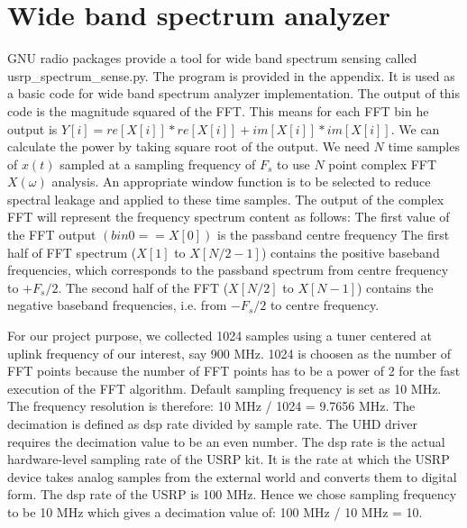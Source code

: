 \section{Wide band spectrum analyzer}

GNU radio packages provide a tool for
wide band spectrum sensing 
called 
usrp\_spectrum\_sense.py. The program is provided in the appendix. 
It is used as
a basic code for wide band spectrum analyzer implementation. The output of this 
code is the magnitude squared of the FFT. This means for each FFT bin he output 
is $ Y[i] = re[X[i]]*re[X[i]] + im[X[i]]*im[X[i]]$. We can calculate the power by
taking square root of the output. We need $N$ time samples of $x(t)$ sampled at a 
sampling frequency of $F_{s}$ to use $N$ point complex FFT $X(\omega)$ analysis. An 
appropriate window function is to be selected to reduce spectral leakage and 
applied to these time samples. The output of the complex FFT will represent the 
frequency spectrum content as follows: The first value of the FFT output 
$(bin0 == X[0])$ is the passband centre frequency The first half of FFT spectrum 
($X[1]$ to $X[N/2-1]$) contains the positive baseband frequencies, which corresponds
to the passband spectrum from centre frequency to $+F_{s}/2$. The second half of the 
FFT ($X[N/2]$ to $X[N-1]$) contains the negative baseband frequencies, i.e. from 
$-F_{s}/2$ to centre frequency.


For our project purpose, we collected 1024 samples using a tuner centered at 
uplink frequency of our interest, say 900 MHz. 1024 is choosen as the number of 
FFT points because the number of FFT points has to be a power of 2 for the fast 
execution of the FFT algorithm. Default  sampling frequency is set as 10 MHz. 
The frequency resolution is therefore: 10 MHz / 1024 = 9.7656 MHz. The 
decimation is defined as dsp rate divided by sample rate. The UHD driver 
requires the decimation value to be an even number. The dsp rate is the actual 
hardware-level sampling rate of the USRP kit. It is the rate at which the USRP 
device takes analog samples from the external world and converts them to digital
form. The dsp rate of the USRP is 100 MHz. Hence we chose sampling frequency to 
be 10 MHz which gives a decimation value of: 100 MHz / 10 MHz = 10.
